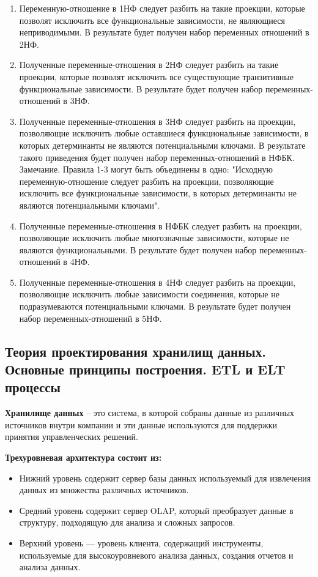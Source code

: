 \begin{enumerate}
	\item Переменную-отношение в 1НФ следует разбить на такие проекции, которые позволят исключить все функциональные зависимости, не являющиеся неприводимыми. В результате будет получен набор переменных отношений в 2НФ.
	\item Полученные переменные-отношения в 2НФ следует разбить на такие проекции, которые позволят исключить все существующие транзитивные функциональные зависимости. В результате будет получен набор переменных-отношений в 3НФ.
	\item Полученные переменные-отношения в 3НФ следует разбить на проекции, позволяющие исключить любые
	оставшиеся функциональные зависимости, в которых детерминанты не являются потенциальными ключами. В результате такого приведения будет получен набор переменных-отношений в НФБК. 
	Замечание.
	Правила 1-3 могут быть объединены в одно: "Исходную переменную-отношение следует разбить на проекции, позволяющие исключить все функциональные зависимости, в которых детерминанты не являются
	потенциальными ключами".
	\item Полученные переменные-отношения в НФБК следует разбить на проекции, позволяющие исключить любые многозначные зависимости, которые не являются функциональными. В результате будет получен
	набор переменных- отношений в 4НФ.
	\item Полученные переменные-отношения в 4НФ следует разбить на проекции, позволяющие исключить любые зависимости соединения, которые не подразумеваются потенциальными ключами. В результате будет
	получен набор переменных-отношений в 5HФ.
\end{enumerate} 

\newpage

\subsection{Теория проектирования хранилищ данных. Основные принципы построения. ETL и ELT процессы}

\textbf{Хранилище данных} – это система, в которой собраны данные из различных источников внутри компании и эти данные используются для поддержки принятия управленческих решений.

\textbf{Трехуровневая архитектура состоит из:}

\begin{itemize}
	\item Нижний уровень содержит сервер базы данных используемый для извлечения данных из множества различных источников.
	\item Средний уровень содержит сервер OLAP, который преобразует данные в структуру, подходящую для анализа и сложных запросов. 
	\item Верхний уровень --- уровень клиента, содержащий инструменты, используемые для высокоуровневого анализа данных, создания отчетов и анализа данных. 
\end{itemize}

